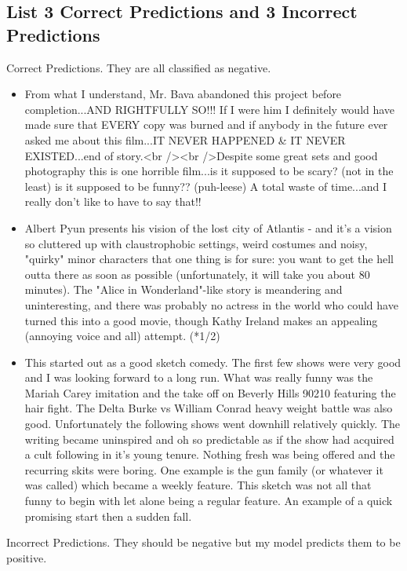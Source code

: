 \documentclass[10pt,a4paper]{article}
\begin{document}
\subsection{List 3 Correct Predictions and 3 Incorrect Predictions}
Correct Predictions. They are all classified as negative.
\begin{itemize}
\item From what I understand, Mr. Bava abandoned this project before completion...AND RIGHTFULLY SO!!! If I were him I definitely would have made sure that EVERY copy was burned and if anybody in the future ever asked me about this film...IT NEVER HAPPENED \& IT NEVER EXISTED...end of story.<br /><br />Despite some great sets and good photography this is one horrible film...is it supposed to be scary? (not in the least) is it supposed to be funny?? (puh-leese) A total waste of time...and I really don't like to have to say that!!
\item Albert Pyun presents his vision of the lost city of Atlantis - and it's a vision so cluttered up with claustrophobic settings, weird costumes and noisy, "quirky" minor characters that one thing is for sure: you want to get the hell outta there as soon as possible (unfortunately, it will take you about 80 minutes). The "Alice in Wonderland"-like story is meandering and uninteresting, and there was probably no actress in the world who could have turned this into a good movie, though Kathy Ireland makes an appealing (annoying voice and all) attempt. (*1/2)
\item This started out as a good sketch comedy. The first few shows were very good and I was looking forward to a long run. What was really funny was the Mariah Carey imitation and the take off on Beverly Hills 90210 featuring the hair fight. The Delta Burke vs William Conrad heavy weight battle was also good. Unfortunately the following shows went downhill relatively quickly. The writing became uninspired and oh so predictable as if the show had acquired a cult following in it's young tenure. Nothing fresh was being offered and the recurring skits were boring. One example is the gun family (or whatever it was called) which became a weekly feature. This sketch was not all that funny to begin with let alone being a regular feature. An example of a quick promising start then a sudden fall.	
\end{itemize}
Incorrect Predictions. They should be negative but my model predicts them to be positive.
\end{document}
